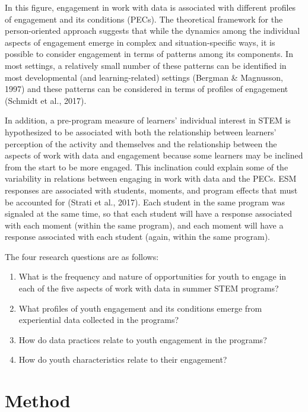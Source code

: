\documentclass[]{book}
\providecommand{\tightlist}{%
  \setlength{\itemsep}{0pt}\setlength{\parskip}{0pt}}
\theoremstyle{definition}
\theoremstyle{definition}
\theoremstyle{definition}
\theoremstyle{remark}
\begin{document}
In this figure, engagement in work with data is associated with
different profiles of engagement and its conditions (PECs). The
theoretical framework for the person-oriented approach suggests that
while the dynamics among the individual aspects of engagement emerge in
complex and situation-specific ways, it is possible to consider
engagement in terms of patterns among its components. In most settings,
a relatively small number of these patterns can be identified in most
developmental (and learning-related) settings (Bergman \& Magnusson,
1997) and these patterns can be considered in terms of profiles of
engagement (Schmidt et al., 2017).

In addition, a pre-program measure of learners' individual interest in
STEM is hypothesized to be associated with both the relationship between
learners' perception of the activity and themselves and the relationship
between the aspects of work with data and engagement because some
learners may be inclined from the start to be more engaged. This
inclination could explain some of the variability in relations between
engaging in work with data and the PECs. ESM responses are associated
with students, moments, and program effects that must be accounted for
(Strati et al., 2017). Each student in the same program was signaled at
the same time, so that each student will have a response associated with
each moment (within the same program), and each moment will have a
response associated with each student (again, within the same program).

The four research questions are as follows:

\begin{enumerate}
\def\labelenumi{\arabic{enumi}.}
\tightlist
\item
  What is the frequency and nature of opportunities for youth to engage
  in each of the five aspects of work with data in summer STEM programs?
\item
  What profiles of youth engagement and its conditions emerge from
  experiential data collected in the programs?
\item
  How do data practices relate to youth engagement in the programs?
\item
  How do youth characteristics relate to their engagement?
\end{enumerate}

\chapter{Method}\label{method}
\end{document}
